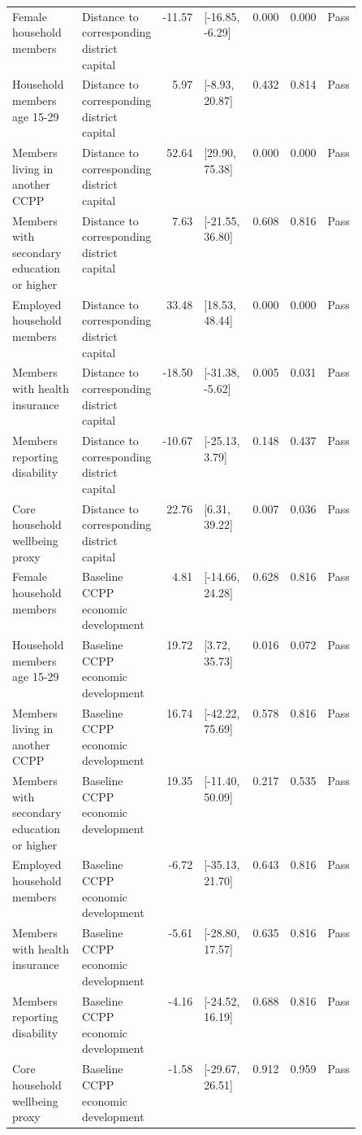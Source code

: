 \begin{longtable}{@{}p{0.20\linewidth}p{0.16\linewidth}rp{0.14\linewidth}rrl@{}}
Female household members & Distance to corresponding district capital & -11.57 & [-16.85, -6.29] & 0.000 & 0.000 & Pass \\
Household members age 15-29 & Distance to corresponding district capital & 5.97 & [-8.93, 20.87] & 0.432 & 0.814 & Pass \\
Members living in another CCPP & Distance to corresponding district capital & 52.64 & [29.90, 75.38] & 0.000 & 0.000 & Pass \\
Members with secondary education or higher & Distance to corresponding district capital & 7.63 & [-21.55, 36.80] & 0.608 & 0.816 & Pass \\
Employed household members & Distance to corresponding district capital & 33.48 & [18.53, 48.44] & 0.000 & 0.000 & Pass \\
Members with health insurance & Distance to corresponding district capital & -18.50 & [-31.38, -5.62] & 0.005 & 0.031 & Pass \\
Members reporting disability & Distance to corresponding district capital & -10.67 & [-25.13, 3.79] & 0.148 & 0.437 & Pass \\
Core household wellbeing proxy & Distance to corresponding district capital & 22.76 & [6.31, 39.22] & 0.007 & 0.036 & Pass \\
Female household members & Baseline CCPP economic development & 4.81 & [-14.66, 24.28] & 0.628 & 0.816 & Pass \\
Household members age 15-29 & Baseline CCPP economic development & 19.72 & [3.72, 35.73] & 0.016 & 0.072 & Pass \\
Members living in another CCPP & Baseline CCPP economic development & 16.74 & [-42.22, 75.69] & 0.578 & 0.816 & Pass \\
Members with secondary education or higher & Baseline CCPP economic development & 19.35 & [-11.40, 50.09] & 0.217 & 0.535 & Pass \\
Employed household members & Baseline CCPP economic development & -6.72 & [-35.13, 21.70] & 0.643 & 0.816 & Pass \\
Members with health insurance & Baseline CCPP economic development & -5.61 & [-28.80, 17.57] & 0.635 & 0.816 & Pass \\
Members reporting disability & Baseline CCPP economic development & -4.16 & [-24.52, 16.19] & 0.688 & 0.816 & Pass \\
Core household wellbeing proxy & Baseline CCPP economic development & -1.58 & [-29.67, 26.51] & 0.912 & 0.959 & Pass \\

\end{longtable}
